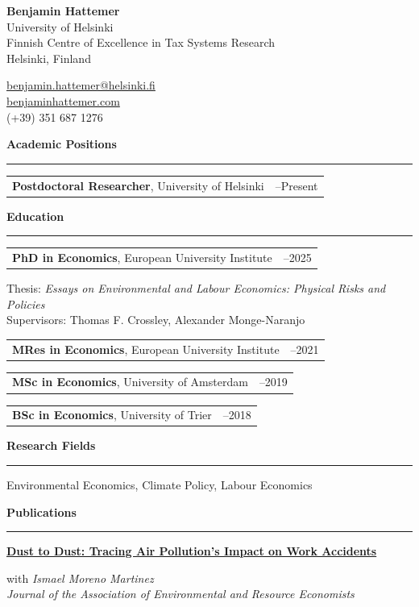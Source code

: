 \documentclass[10pt]{article}
\makeatletter
\newcommand{\cvsection}[1]{%
    \vspace{0.95em}
    {\large\bfseries #1}\par
    \vspace{0.10em}
    \hrule
    \vspace{0.55em}
}
\newcommand{\datedentry}[3]{%
    \begin{tabularx}{\textwidth}{@{}X>{\raggedleft\arraybackslash}p{3.1cm}@{}}
        #1 & #2
    \end{tabularx}
    #3
}
\newcommand{\paper}[3]{%
    \textbf{\href{#2}{#1}}\par
    #3
}
\makeatother
\begin{document}
\begin{minipage}[t]{0.60\textwidth}
    {\LARGE\bfseries Benjamin Hattemer}\\[3pt]
    University of Helsinki\\
    Finnish Centre of Excellence in Tax Systems Research\\
    Helsinki, Finland
\end{minipage}
\hfill
\begin{minipage}[t]{0.37\textwidth}
    \raggedleft
    \href{mailto:benjamin.hattemer@helsinki.fi}{benjamin.hattemer@helsinki.fi}\\
    \href{https://benjaminhattemer.com}{benjaminhattemer.com}\\
    (+39) 351 687 1276
\end{minipage}

\cvsection{Academic Positions}

\datedentry{\textbf{Postdoctoral Researcher}, University of Helsinki}{2026--Present}

\cvsection{Education}

\datedentry{\textbf{PhD in Economics}, European University Institute}{2021--2025}{%

\vspace{0.25em}

    Thesis: \textit{Essays on Environmental and Labour Economics: Physical Risks and Policies}\\
    Supervisors: Thomas F. Crossley, Alexander Monge-Naranjo\\
}

\vspace{0.35em}
\datedentry{\textbf{MRes in Economics}, European University Institute}{2020--2021}{}

\vspace{0.15em}
\datedentry{\textbf{MSc in Economics}, University of Amsterdam}{2018--2019}{}

\vspace{0.15em}
\datedentry{\textbf{BSc in Economics}, University of Trier}{2014--2018}

\cvsection{Research Fields}

Environmental Economics, Climate Policy, Labour Economics

\cvsection{Publications}

\paper
{Dust to Dust: Tracing Air Pollution's Impact on Work Accidents}
{https://www.journals.uchicago.edu/doi/abs/10.1086/739151}
{with \textit{Ismael Moreno Martinez}\\
\textit{Journal of the Association of Environmental and Resource Economists}}
\end{document}
